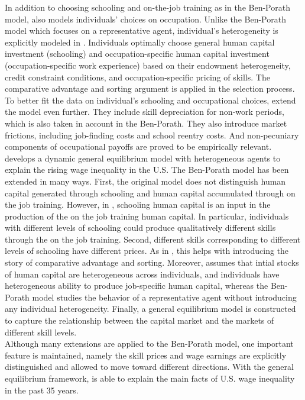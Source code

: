 \indent In addition to choosing schooling and on-the-job training as in the Ben-Porath model, \citet{keane1997career} also models individuals' choices on occupation. Unlike the Ben-Porath model which focuses on a representative agent, individual's heterogeneity is explicitly modeled in \citet{keane1997career}. Individuals optimally choose general human capital investment (schooling) and occupation-specific human capital investment (occupation-specific work experience) based on their endowment heterogeneity, credit constraint conditions, and occupation-specific pricing of skills. The comparative advantage and sorting argument is applied in the selection process. \\
\indent To better fit the data on individual's schooling and occupational choices, \citet{keane1997career} extend the model even further. They include skill depreciation for non-work periods, which is also taken in account in the Ben-Porath. They also introduce market frictions, including job-finding costs and school reentry costs. And non-pecuniary components of occupational payoffs are proved to be empirically relevant.\\
\indent \citet{heckman1998explaining} develops a dynamic general equilibrium model with heterogeneous agents to explain the rising wage inequality in the U.S. The Ben-Porath model has been extended in many ways. First, the original model does not distinguish human capital generated through schooling and human capital accumulated through on the job training. However, in \citet{heckman1998explaining}, schooling human capital is an input in the production of the on the job training human capital. In particular, individuals with different levels of schooling could produce qualitatively different skills through the on the job training. Second, different skills corresponding to different levels of schooling have different prices. As in \citet{keane1997career}, this helps with introducing the story of comparative advantage and sorting. Moreover, \citet{heckman1998explaining} assumes that intial stocks of human capital are heterogeneous across individuals, and individuals have heterogeneous ability to produce job-specific human capital, whereas the Ben-Porath model studies the behavior of a representative agent without introducing any individual heterogeneity. Finally, a general equilibrium model is constructed to capture the relationship between the capital market and the markets of different skill levels. \\
\indent Although many extensions are applied to the Ben-Porath model, one important feature is maintained, namely the skill prices and wage earnings are explicitly distinguished and allowed to move toward different directions. With the general equilibrium framework, \citet{heckman1998explaining} is able to explain the main facts of U.S. wage inequality in the past 35 years.\\
